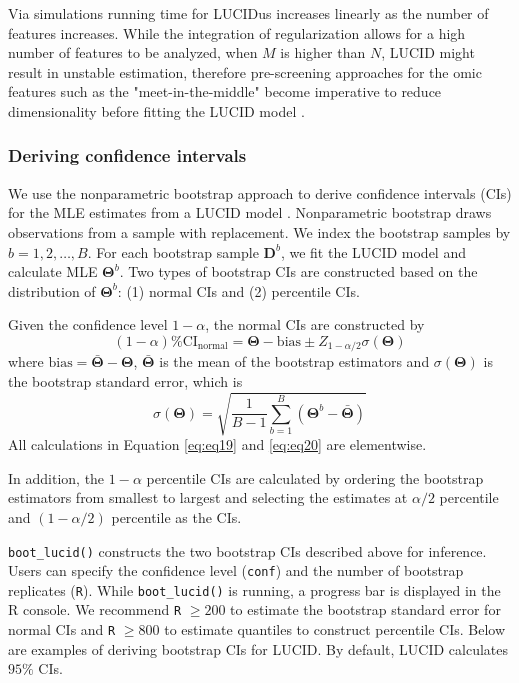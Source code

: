 Via simulations running time for LUCIDus increases linearly as the
number of features increases. While the integration of regularization
allows for a high number of features to be analyzed, when \(M\) is higher
than \(N\), LUCID might result in unstable estimation, therefore
pre-screening approaches for the omic features such as the
"meet-in-the-middle" become imperative to reduce dimensionality before
fitting the LUCID model \citep{CADIOU2021106509}.

\subsubsection{Deriving confidence intervals}\label{sec3.4}

We use the nonparametric bootstrap approach to derive confidence
intervals (CIs) for the MLE estimates from a LUCID model
\citep{davison1997bootstrap}. Nonparametric bootstrap draws observations from
a sample with replacement. We index the bootstrap samples by
\(b = 1, 2, \ldots, B\). For each bootstrap sample
\(\boldsymbol{\mathbf{D}}^b\), we fit the LUCID model and calculate MLE
\(\boldsymbol{\mathbf{\Theta}}^b\). Two types of bootstrap CIs are
constructed based on the distribution of
\(\boldsymbol{\mathbf{\Theta}}^b\): (1) normal CIs and (2) percentile CIs.

Given the confidence level \(1 - \alpha\), the normal CIs are constructed
by
\[(1 - \alpha)\% \text{CI}_{\text{normal}} = \boldsymbol{\mathbf{\Theta}} - \text{bias} \pm Z_{1 - \alpha/2}\sigma(\boldsymbol{\mathbf{\Theta}})
    \label{eq19}   \label{eq:eq19}\]
where
\(\text{bias} = \bar{\boldsymbol{\mathbf{\Theta}}} - \boldsymbol{\mathbf{\Theta}}\),
\(\bar{\boldsymbol{\mathbf{\Theta}}}\) is the mean of the bootstrap
estimators and \(\sigma(\boldsymbol{\mathbf{\Theta}})\) is the bootstrap
standard error, which is
\[\sigma(\boldsymbol{\mathbf{\Theta}}) = \sqrt{\frac{1}{B - 1}\sum_{b=1}^B\left(\boldsymbol{\mathbf{\Theta}}^b - \bar{\boldsymbol{\mathbf{\Theta}}}\right)}
    \label{eq20}   \label{eq:eq20}\]
All calculations in Equation \eqref{eq:eq19} and \eqref{eq:eq20} are
elementwise.

In addition, the \(1 - \alpha\) percentile CIs are calculated by ordering
the bootstrap estimators from smallest to largest and selecting the
estimates at \(\alpha/2\) percentile and \((1 - \alpha/2)\) percentile as
the CIs.

\texttt{boot\_lucid()} constructs the two bootstrap CIs described above for
inference. Users can specify the confidence level (\texttt{conf}) and the
number of bootstrap replicates (\texttt{R}). While \texttt{boot\_lucid()} is running, a
progress bar is displayed in the R console. We recommend \texttt{R} \(\geq 200\)
to estimate the bootstrap standard error for normal CIs and \texttt{R}
\(\geq 800\) to estimate quantiles to construct percentile CIs. Below are
examples of deriving bootstrap CIs for LUCID. By default, LUCID
calculates \(95\%\) CIs.

